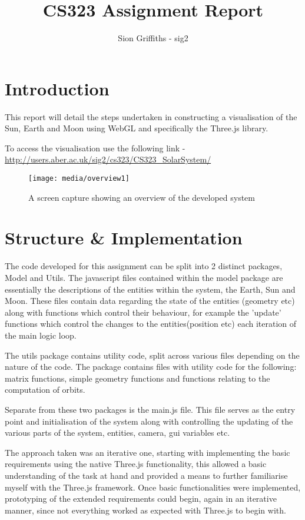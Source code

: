 \documentclass[titlepage]{article}
\title{CS323 Assignment Report}
\author{Sion Griffiths - sig2}
\begin{document}
\maketitle
\tableofcontents




\newpage
\section{Introduction}

This report will detail the steps undertaken in constructing a visualisation of the Sun, Earth and Moon using WebGL and specifically the Three.js library.

To access the visualisation use the following link -  \url{http://users.aber.ac.uk/sig2/cs323/CS323\_SolarSystem/}


\begin{figure}[h!]
                \centering
                \texttt{[image: media/overview1]}
                \caption{A screen capture showing an overview of the developed system}
                \label{fig:basic_model}
            \end{figure}


\section{Structure \& Implementation}
The code developed for this assignment can be split into 2 distinct packages, Model and Utils. The javascript files contained within the model package are essentially the descriptions of the entities within the system, the Earth, Sun and Moon. These files contain data regarding the state of the entities (geometry etc) along with functions which control their behaviour, for example the 'update' functions which control the changes to the entities(position etc) each iteration of the main logic loop.


The utils package contains utility code, split across various files depending on the nature of the code. The package contains files with utility code for the following: matrix functions, simple geometry functions and functions relating to the computation of orbits.


Separate from these two packages is the main.js file. This file serves as the entry point and initialisation of the system along with controlling the updating of the various parts of the system, entities, camera, gui variables etc. 


The approach taken was an iterative one, starting with implementing the basic requirements using the native Three.js functionality, this allowed a basic understanding of the task at hand and provided a means to further familiarise myself with the Three.js framework. Once basic functionalities were implemented, prototyping of the extended requirements could begin, again in an iterative manner, since not everything worked as expected with Three.js to begin with.
\end{document}

